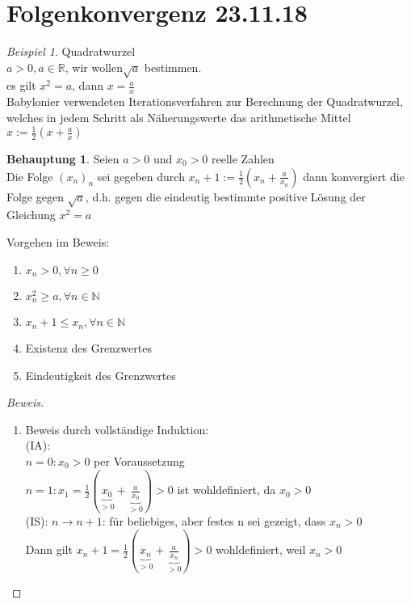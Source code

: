 \documentclass[12pt,a4paper,titlepage]{article} %
\theoremstyle{definition}
\newtheorem*{beh}{Behauptung}
\theoremstyle{remark}
\newtheorem*{bsp}{Beispiel}
\newenvironment{bew}{\begin{proof}[Beweis]}{\end{proof}}
\newcommand{\N}{\mathbb{N}}
\newcommand{\R}{\mathbb{R}}
\begin{document}
	\section{Folgenkonvergenz 23.11.18}
	\begin{bsp}
		Quadratwurzel\\
		\(a > 0, a \in \R\), wir wollen\(\sqrt{a}\) bestimmen.\\
		es gilt \(x^2 = a\), dann \(x = \frac{a}{x}\)\vspace{5mm}\\
		Babylonier verwendeten Iterationsverfahren zur Berechnung der Quadratwurzel, welches in jedem Schritt als Näherungswerte das arithmetische Mittel\vspace{5mm}\\
		\(x := \frac{1}{2}(x+\frac{a}{x})\)
		\begin{beh}
			Seien \(a > 0\) und \(x_0 > 0\) reelle Zahlen\\
			Die Folge \((x_n)_n\) sei gegeben durch \(x_n+1 := \frac{1}{2}(x_n + \frac{a}{x_n})\) dann konvergiert die Folge gegen \(\sqrt{a}\), d.h. gegen die eindeutig bestimmte positive Lösung der Gleichung \(x^2 = a\)
		\end{beh}		
		Vorgehen im Beweis:
		\begin{enumerate}
			\item \(x_n > 0, \forall n \geq 0\)
			\item \(x_n^2 \geq a, \forall n \in \N\)
			\item \(x_n+1 \leq x_n, \forall n \in \N\)
			\item Existenz des Grenzwertes
			\item Eindeutigkeit des Grenzwertes
		\end{enumerate}
		\begin{bew}
			\vspace{5mm}
			\begin{enumerate}				
				\item 
					Beweis durch vollständige Induktion:\\
					(IA):\\
					\(n=0: x_0 > 0\) per Voraussetzung\\
					\(n=1: x_1 = \frac{1}{2}(\underbrace{x_0}_{>0} + \underbrace{\frac{a}{x_0}}_{>0}) > 0\) ist wohldefiniert, da \(x_0 > 0\)\\
					(IS): \(n \rightarrow n+1\): für beliebiges, aber festes n sei gezeigt, dass \(x_n > 0\)\\
					Dann gilt \(x_n+1 = \frac{1}{2}(\underbrace{x_n}_{>0} + \underbrace{\frac{a}{x_n}}_{>0}) > 0\) wohldefiniert, weil \(x_n > 0\)\\

\end{enumerate}
\end{bew}
\end{bsp}
\end{document}
